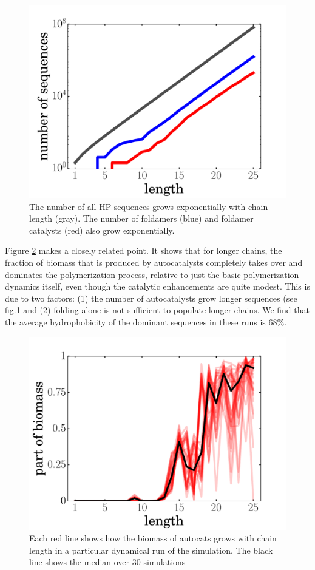 \documentclass[5p,times]{elsarticle}
\begin{document}
\begin{figure}[hbt!]
  \centering
  \includegraphics[width=0.9\columnwidth]{pictures/hp-statistics.pdf} 
  \caption{\footnotesize{The number of all HP sequences grows exponentially with chain 
length (gray).  The number of foldamers (blue) and foldamer catalysts (red) also grow 
exponentially.}}
  \label{fig:hp-statistics}
\end{figure}

 Figure \ref{fig:biomass} makes a closely related point.  It shows that for longer chains, the 
fraction of biomass that is produced by autocatalysts completely takes over and dominates the 
polymerization process, relative to just the basic polymerization dynamics itself, even though the 
catalytic enhancements are quite modest.  This is due to two factors: (1) the number of 
autocatalysts grow longer sequences (see fig.\ref{fig:hp-statistics} and (2) folding alone is not 
sufficient to populate longer chains.  We find that the average hydrophobicity of the dominant 
sequences in these runs is $68\%$.
 
\begin{figure}[h!]
  \centering
  \includegraphics[width=0.9\columnwidth]{pictures/biomass.pdf} 
  \caption{\footnotesize{Each red line shows how the biomass of autocats grows with chain length in 
a particular dynamical run of the simulation.  The black line shows the median over 30 simulations 
}}
  \label{fig:biomass}
\end{figure}
\end{document}
